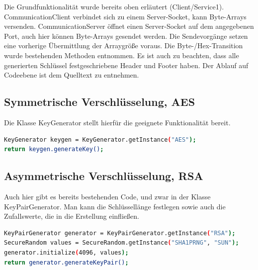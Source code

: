 \documentclass[letterpaper, 12pt]{article}
\let\tempsubsection\subsection
\renewcommand\subsection[1]{\vspace{0cm}\tempsubsection{#1}\vspace{0cm}}
\begin{document}
Die Grundfunktionalität wurde bereits oben erläutert (Client/Service1). CommunicationClient verbindet sich zu einem Server-Socket, kann Byte-Arrays versenden. CommunicationServer öffnet einen Server-Socket auf dem angegebenen Port, auch hier können Byte-Arrays gesendet werden. Die Sendevorgänge setzen eine vorherige Übermittlung der Arraygröße voraus. Die Byte-/Hex-Transition wurde bestehenden Methoden entnommen. Es ist auch zu beachten, dass alle generierten Schlüssel festgeschriebene Header und Footer haben. Der Ablauf auf Codeebene ist dem Quelltext zu entnehmen.

\subsection{Symmetrische Verschlüsselung, AES}
Die Klasse KeyGenerator stellt hierfür die geeignete Funktionalität bereit.

\begin{lstlisting}[frame=single,language=bash, caption=Symmetrische Verschlüsselung]
KeyGenerator keygen = KeyGenerator.getInstance("AES");
return keygen.generateKey();
\end{lstlisting}

\subsection{Asymmetrische Verschlüsselung, RSA}

Auch hier gibt es bereits bestehenden Code, und zwar in der Klasse KeyPairGenerator. Man kann die Schlüssellänge festlegen sowie auch die Zufallswerte, die in die Erstellung einfließen.

\begin{lstlisting}[frame=single,language=bash, caption=Symmetrische Verschlüsselung]
KeyPairGenerator generator = KeyPairGenerator.getInstance("RSA");
SecureRandom values = SecureRandom.getInstance("SHA1PRNG", "SUN");
generator.initialize(4096, values);
return generator.generateKeyPair();
\end{lstlisting}

\newpage


\lstlistoflistings
\listoffigures
\end{document}

